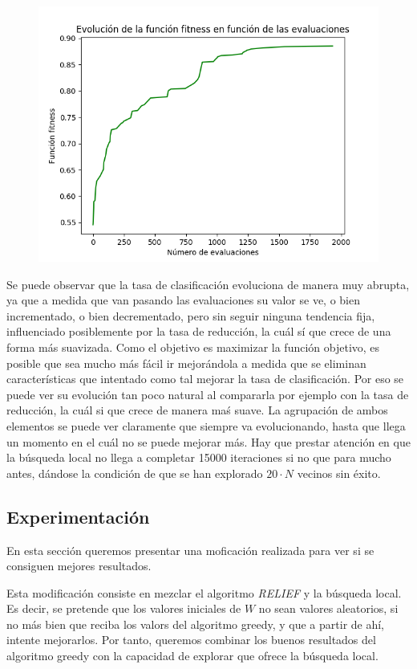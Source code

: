 \documentclass[11pt,a4paper]{article}
\begin{document}
\begin{figure}[H]
\centering
\includegraphics[scale=0.6]{img/fit_texture.png}
\end{figure}

Se puede observar que la tasa de clasificación evoluciona de manera muy abrupta, ya que a medida que van pasando las
evaluaciones su valor se ve, o bien incrementado, o bien decrementado, pero sin seguir ninguna tendencia fija, influenciado
posiblemente por la tasa de reducción, la cuál sí que crece de una forma más suavizada. Como el objetivo es maximizar la
función objetivo, es posible que sea mucho más fácil ir mejorándola a medida que se eliminan características que intentado
como tal mejorar la tasa de clasificación. Por eso se puede ver su evolución tan poco natural al compararla por ejemplo con
la tasa de reducción, la cuál si que crece de manera maś suave. La agrupación de ambos elementos se puede ver claramente que
siempre va evolucionando, hasta que llega un momento en el cuál no se puede mejorar más. Hay que prestar atención en que la
búsqueda local no llega a completar 15000 iteraciones si no que para mucho antes, dándose la condición de que se han
explorado $20 \cdot N$ vecinos sin éxito.

\subsection{Experimentación}

En esta sección queremos presentar una moficación realizada para ver si se consiguen mejores resultados.

Esta modificación consiste en mezclar el algoritmo \textit{RELIEF} y la búsqueda local. Es decir, se pretende que los valores
iniciales de $W$ no sean valores aleatorios, si no más bien que reciba los valors del algoritmo greedy, y que a partir de ahí,
intente mejorarlos. Por tanto, queremos combinar los buenos resultados del algoritmo greedy con la capacidad de explorar
que ofrece la búsqueda local.
\end{document}
